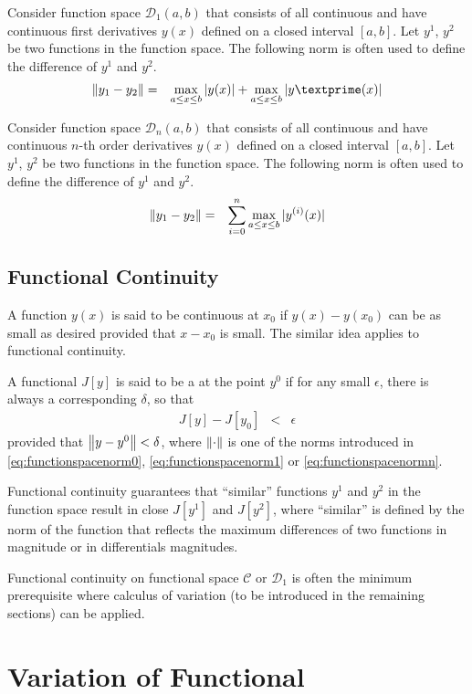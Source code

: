 Consider function space $\mathcal{D}_1(a,b)$ that consists of all continuous and have continuous first derivatives $y(x)$ defined on a closed interval $[a,b]$. Let $y^1$, $y^2$ be two functions in the function space. The following norm is often used to define the difference of $y^1$ and $y^2$.
\begin{eqnarray}
  \norm{y_1 - y_2} &=& \max_{a\leq x \leq b} |y(x)| + \max_{a\leq x \leq b} |y\textprime(x)| \label{eq:functionspacenorm1}
\end{eqnarray} 

Consider function space $\mathcal{D}_n(a,b)$ that consists of all continuous and have continuous $n$-th order derivatives $y(x)$ defined on a closed interval $[a,b]$. Let $y^1$, $y^2$ be two functions in the function space. The following norm is often used to define the difference of $y^1$ and $y^2$.
\begin{eqnarray}
  \left\lVert y_1 - y_2\right\rVert &=& \sum_{i=0}^{n} \max_{a\leq x \leq b} |y^{(i)}(x)| \label{eq:functionspacenormn}
\end{eqnarray} 

\subsection{Functional Continuity}

A function $y(x)$ is said to be continuous at $x_0$ if $y(x) - y(x_0)$ can be as small as desired provided that $x-x_0$ is small. The similar idea applies to functional continuity. 

A functional $J[y]$ is said to be a  at the point $y^0$ if for any small $\epsilon$, there is always a corresponding $\delta$, so that
\begin{eqnarray}
  J[y] - J[y_0] &<& \epsilon \nonumber
\end{eqnarray}
provided that $\left\lVert y-y^0\right\rVert < \delta$, where $\left\lVert\cdot\right\rVert$ is one of the norms introduced in \eqref{eq:functionspacenorm0}, \eqref{eq:functionspacenorm1} or \eqref{eq:functionspacenormn}. 

Functional continuity guarantees that ``similar'' functions $y^1$ and $y^2$ in the function space result in close $J[y^1]$ and $J[y^2]$, where ``similar'' is defined by the norm of the function that reflects the maximum differences of two functions in magnitude or in differentials magnitudes.

Functional continuity on functional space $\mathcal{C}$ or $\mathcal{D}_1$ is often the minimum prerequisite where calculus of variation (to be introduced in the remaining sections) can be applied.
 
\section{Variation of Functional}










